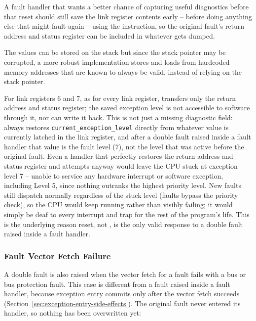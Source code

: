 A fault handler that wants a better chance of capturing useful diagnostics before that reset should still save the link
register contents early -- before doing anything else that might fault again -- using the  instruction,
so the original fault's return address and status register can be included in whatever gets dumped.

The values can be stored on the stack but since the stack pointer may be corrupted, a more robust implementation stores
and loads from hardcoded memory addresses that are known to always be valid, instead of relying on the stack pointer.

For link registers 6 and 7, as for every link register,  transfers only the return address and status
register; the saved exception level is not accessible to software through it, nor can  write it back.
This is not just a missing diagnostic field:  always restores \texttt{current\_exception\_level}
directly from whatever value is currently latched in the link register, and after a double fault raised inside a fault
handler that value is the fault level (7), not the level that was active before the original fault. Even a handler that
perfectly restores the return address and status register and attempts  anyway would leave the CPU stuck
at exception level 7 -- unable to service any hardware interrupt or software exception, including Level 5, since
nothing outranks the highest priority level. New faults still dispatch normally regardless of the stuck level (faults
bypass the priority check), so the CPU would keep running rather than visibly failing; it would simply be deaf to every
interrupt and trap for the rest of the program's life. This is the underlying reason reset, not , is the
only valid response to a double fault raised inside a fault handler.

\subsubsection{Fault Vector Fetch Failure}
\label{sec:double-fault-vector-fetch}

A double fault is also raised when the vector fetch for a fault fails with a bus or bus protection fault. This case is
different from a fault raised inside a fault handler, because exception entry commits only after the vector fetch
succeeds (Section~\ref{sec:exception-entry-side-effects}). The original fault never entered its handler, so nothing has
been overwritten yet:

